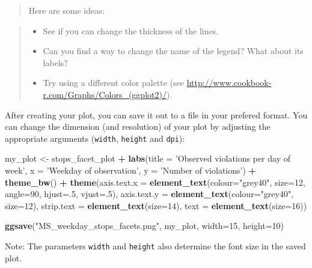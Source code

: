 \documentclass[]{book}
\newenvironment{Shaded}{\begin{snugshade}}{\end{snugshade}}
\newcommand{\DataTypeTok}[1]{\textcolor[rgb]{0.13,0.29,0.53}{#1}}
\newcommand{\DecValTok}[1]{\textcolor[rgb]{0.00,0.00,0.81}{#1}}
\newcommand{\KeywordTok}[1]{\textcolor[rgb]{0.13,0.29,0.53}{\textbf{#1}}}
\newcommand{\NormalTok}[1]{#1}
\newcommand{\OperatorTok}[1]{\textcolor[rgb]{0.81,0.36,0.00}{\textbf{#1}}}
\newcommand{\StringTok}[1]{\textcolor[rgb]{0.31,0.60,0.02}{#1}}
\providecommand{\tightlist}{%
  \setlength{\itemsep}{0pt}\setlength{\parskip}{0pt}}
\begin{document}
\begin{quote}
Here are some ideas:
\end{quote}

\begin{quote}
\begin{itemize}
\tightlist
\item
  See if you can change the thickness of the lines.
\item
  Can you find a way to change the name of the legend? What about its labels?
\item
  Try using a different color palette (see \url{http://www.cookbook-r.com/Graphs/Colors_(ggplot2)/}).
\end{itemize}
\end{quote}

After creating your plot, you can save it out to a file in your prefered format. You can change the dimension (and resolution) of your plot by adjusting the appropriate arguments (\texttt{width}, \texttt{height} and \texttt{dpi}):

\begin{Shaded}
\begin{Highlighting}[]
\NormalTok{my_plot <-}\StringTok{ }\NormalTok{stops_facet_plot }\OperatorTok{+}
\StringTok{  }\KeywordTok{labs}\NormalTok{(}\DataTypeTok{title =} \StringTok{'Observed violations per day of week'}\NormalTok{,}
         \DataTypeTok{x =} \StringTok{'Weekday of observation'}\NormalTok{,}
         \DataTypeTok{y =} \StringTok{'Number of violations'}\NormalTok{) }\OperatorTok{+}
\StringTok{  }\KeywordTok{theme_bw}\NormalTok{() }\OperatorTok{+}\StringTok{ }
\StringTok{  }\KeywordTok{theme}\NormalTok{(}\DataTypeTok{axis.text.x =} \KeywordTok{element_text}\NormalTok{(}\DataTypeTok{colour=}\StringTok{"grey40"}\NormalTok{, }\DataTypeTok{size=}\DecValTok{12}\NormalTok{, }\DataTypeTok{angle=}\DecValTok{90}\NormalTok{, }\DataTypeTok{hjust=}\NormalTok{.}\DecValTok{5}\NormalTok{, }\DataTypeTok{vjust=}\NormalTok{.}\DecValTok{5}\NormalTok{),}
        \DataTypeTok{axis.text.y =} \KeywordTok{element_text}\NormalTok{(}\DataTypeTok{colour=}\StringTok{"grey40"}\NormalTok{, }\DataTypeTok{size=}\DecValTok{12}\NormalTok{),}
        \DataTypeTok{strip.text =} \KeywordTok{element_text}\NormalTok{(}\DataTypeTok{size=}\DecValTok{14}\NormalTok{),}
        \DataTypeTok{text =} \KeywordTok{element_text}\NormalTok{(}\DataTypeTok{size=}\DecValTok{16}\NormalTok{))}

\KeywordTok{ggsave}\NormalTok{(}\StringTok{"MS_weekday_stops_facets.png"}\NormalTok{, my_plot, }\DataTypeTok{width=}\DecValTok{15}\NormalTok{, }\DataTypeTok{height=}\DecValTok{10}\NormalTok{)}
\end{Highlighting}
\end{Shaded}

Note: The parameters \texttt{width} and \texttt{height} also determine the font size in the saved plot.


\end{document}

